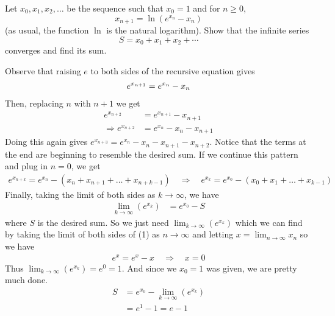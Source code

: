 \begin{problem}[D][8][Putnam 2016 /B1]
        Let $x_0, x_1, x_2, \dots$ be the sequence such that $x_0 = 1$ and for $n \geq 0$,
        \[
        x_{n+1} = \ln\left(e^{x_n} - x_n\right)
        \]
        (as usual, the function $\ln$ is the natural logarithm). Show that the infinite series
        \[
        S = x_0 + x_1 + x_2 + \cdots
        \]
        converges and find its sum.
\end{problem}

\begin{solution}
   Observe that raising $e$ to both sides of the recursive equation gives
   \begin{align}\setcounter{equation}{0}
       e^{x_{n+1}}=e^{x_n}-x_n
   \end{align}
   Then, replacing $n$ with $n+1$ we get
   \begin{align*}
        e^{x_{n+2}} &= e^{x_{n+1}}-x_{n+1}\\
        \Rightarrow e^{x_{n+2}} &= e^{x_n}-x_n-x_{n+1}
   \end{align*}
   Doing this again gives $e^{x_{n+3}} = e^{x_n}-x_n-x_{n+1}-x_{n+2}$. Notice that the terms at the end are beginning to resemble the desired sum. If we continue this pattern and plug in $n=0$, we get
   \begin{align*}
        e^{x_{n+k}} = e^{x_n}-(x_n+x_{n+1}+\dots+x_{n+k-1}) \quad \Rightarrow \quad e^{x_{k}} = e^{x_0}-(x_0+x_{1}+\dots+x_{k-1})
   \end{align*}
   Finally, taking the limit of both sides as $k \rightarrow \infty$, we have
      \begin{align*}
        \lim_{k\rightarrow\infty}(e^{x_{k}}) &= e^{x_0}-S
   \end{align*}
   where $S$ is the desired sum. So we just need $\lim_{k\rightarrow\infty}(e^{x_{k}})$ which we can find by taking the limit of both sides of (1) as $n\rightarrow\infty$ and letting $x=\lim_{n\rightarrow\infty}x_n$ so we have 
   \begin{align*}
       e^x=e^x-x \quad \Rightarrow \quad x=0
   \end{align*}
   Thus $\lim_{k\rightarrow\infty}(e^{x_{k}}) = e^0 = 1$. And since we $x_0=1$ was given, we are pretty much done.
   \begin{align*}
       S &= e^{x_0}-\lim_{k\rightarrow\infty}(e^{x_{k}})\\
       &= e^1 - 1 = \boxed{e-1}
   \end{align*}
\end{solution}


